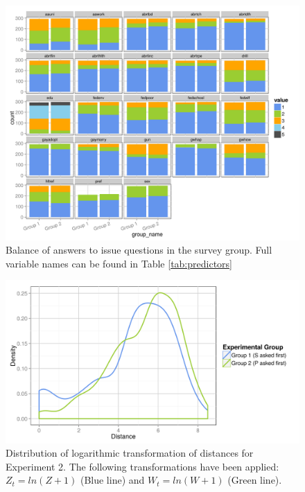 \begin{figure}[ht!]
  \centering
  \includegraphics{../figures/main/bal.png}
  \caption{Balance of answers to issue questions in the survey group. Full variable names can be found in Table \ref{tab:predictors}}
  \label{fig:bal}
\end{figure}

\begin{figure}[ht!]
  \centering
  \includegraphics{../figures/main/dist_dista_log.png}
  \caption{Distribution of logarithmic transformation of distances for Experiment 2. The following transformations have been applied: $Z_t = ln(Z + 1)$ (Blue line) and $W_t = ln(W + 1)$ (Green line).}
  \label{fig:d_dist_log}
\end{figure}



\clearpage

